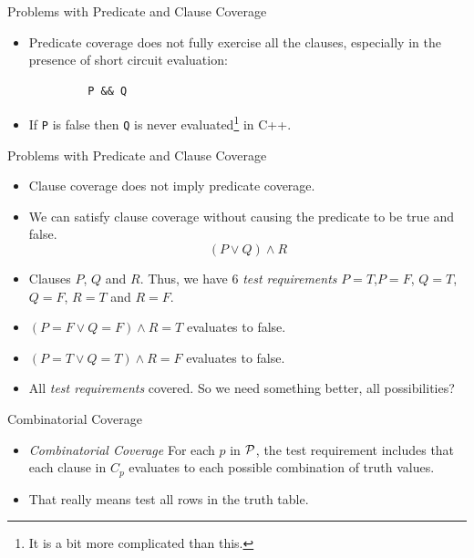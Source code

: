 \documentclass{beamer}
\newcommand{\predset}{{\cal P}}
\begin{document}
\begin{frame}[fragile]{Problems with Predicate and Clause Coverage} 
  \begin{itemize}
  \item Predicate coverage does not fully exercise all the clauses,
    especially in the presence of short circuit evaluation:
    \begin{center}
      \begin{verbatim}
         P && Q
      \end{verbatim}
    \end{center}
  \item If \verb+P+ is false then \verb+Q+ is never
    evaluated\footnote{It is a bit more complicated than this.} in C++.
  \end{itemize}
  
\end{frame}
\begin{frame}[fragile]{Problems with Predicate and Clause Coverage} 
  \begin{itemize}
  \item Clause coverage does not imply predicate coverage.
  \item We can satisfy clause coverage without causing the predicate
    to be  true and false.
    \[
     (P \lor Q) \land R
    \]
    \item Clauses $P$, $Q$ and $R$. Thus, we have 6 {\it test requirements} $P=T$,$P=F$,
    $Q=T$,$Q=F$, $R=T$ and $R=F$.
  \item $(P=F \lor Q=F)    \land R=T$ evaluates to false.
  \item $(P=T \lor Q=T)    \land R=F$ evaluates to false.
  \item All {\it test requirements} covered.  So we need something better,
    all possibilities?
  \end{itemize}  
\end{frame}
\begin{frame}{Combinatorial Coverage}
  \begin{itemize}
  \item {\em Combinatorial Coverage} For each $p$ in $\predset$, the
    test requirement includes that each clause in $C_p$ evaluates to
    each possible combination of truth values.
  \item That really means test all rows in the truth table. 

  \end{itemize}
\end{frame}
\end{document}

